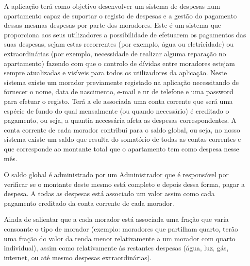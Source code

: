 A aplicação terá como objetivo desenvolver um sistema de despesas num apartamento  capaz de suportar o registo de despesas e a gestão do pagamento dessas mesmas despesas por parte dos moradores. Este é um sistema que proporciona aos seus utilizadores a possibilidade de efetuarem os pagamentos das suas despesas, sejam estas recorrentes (por exemplo, água ou eletricidade) ou extraordinárias (por exemplo, necessidade de realizar alguma reparação no apartamento) fazendo com que o controlo de dívidas entre moradores estejam sempre atualizadas e visíveis para todos os utilizadores da aplicação. 	
Neste sistema existe um morador previamente registado na aplicação necessitando de fornecer o nome, data de nascimento, e-mail e nr de telefone e uma password para efetuar o registo. Terá a ele associada uma conta corrente que será uma espécie de fundo do qual mensalmente (ou quando necessário) é creditado o pagamento, ou seja, a quantia necessária afeta as despesas correspondentes. A conta corrente de cada morador contribui para o saldo global, ou seja, no nosso sistema existe um saldo que resulta do somatório de todas as contas correntes e que corresponde ao montante total que o apartamento tem como despesa nesse mês. 

O saldo global é administrado por um Administrador que é responsável por verificar se o montante deste mesmo está completo e depois dessa forma, pagar a despesa. A todas as despesas está associado um valor assim como cada pagamento creditado da conta corrente de cada morador. 

Ainda de salientar que a cada morador está associada uma fração que varia consoante o tipo de morador (exemplo: moradores que partilham quarto, terão uma fração do valor da renda menor relativamente a um morador com quarto individual), assim como relativamente às restantes despesas (água, luz, gás, internet, ou até mesmo despesas extraordinárias). 


 	